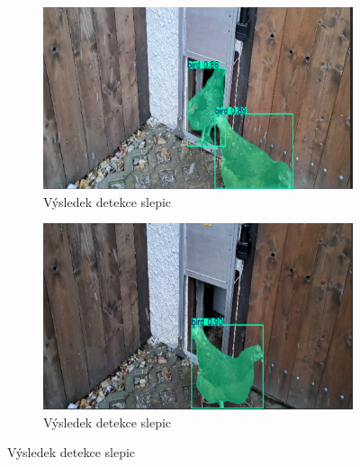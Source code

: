 \begin{figure}[h]
    \begin{subfigure}[t]{1\textwidth}
        \centering
        \includegraphics[width=\textwidth]{img/chicken_detection3}
        \caption{Výsledek detekce slepic}
        \label{fig:chicken_detection3}
    \end{subfigure}

    \begin{subfigure}[t]{1\textwidth}
        \centering
        \includegraphics[width=\textwidth]{img/chicken_detection4}
        \caption{Výsledek detekce slepic}
        \label{fig:chicken_detection4}
    \end{subfigure}
\end{figure}

\newpage

